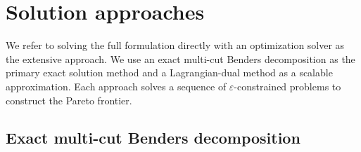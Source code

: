 \documentclass[preprint,11pt,authoryear]{elsarticle}
\begin{document}
\section{Solution approaches}
\label{sec:solution}

We refer to solving the full formulation directly with an optimization solver
as the extensive approach. We use an exact multi-cut Benders decomposition as the primary exact solution method and a Lagrangian-dual
method as a scalable approximation. Each approach solves a sequence of $\varepsilon$-constrained problems to construct the Pareto frontier.

\subsection{Exact multi-cut Benders decomposition}
\label{sec:benders}
\end{document}
